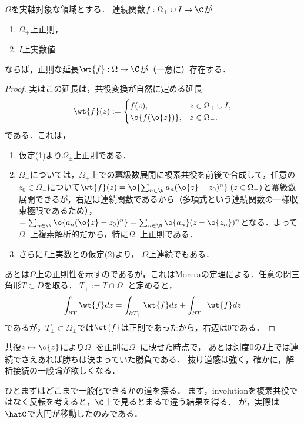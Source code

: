 \documentclass[uplatex, dvipdfmx]{jsreport}
\begin{document}
\begin{theorem}\label{thm-Schwarz-reflection-principle}
    $\Omega$を実軸対象な領域とする．
    連続関数$f:\Omega_+\cup I\to\C$が
    \begin{enumerate}
        \item $\Omega_+$上正則，
        \item $I$上実数値
    \end{enumerate}
    ならば，正則な延長$\wt{f}:\Omega\to\C$が（一意に）存在する．
\end{theorem}
\begin{proof}
    実はこの延長は，共役変換が自然に定める延長
    \[\wt{f}(z):=\begin{cases}
        f(z),&z\in\Omega_+\cup I,\\
        \o{f(\o{z})},&z\in\Omega_-.
    \end{cases}\]
    である．これは，
    \begin{enumerate}
        \item 仮定(1)より$\Omega_\pm$上正則である．
        \item $\Omega_-$については，$\Omega_+$上での冪級数展開に複素共役を前後で合成して，任意の$z_0\in\Omega_-$について$\wt{f}(z)=\o{\sum_{n\in\N}a_n(\o{z}-z_0)^n}\;(z\in\Omega_-)$と冪級数展開できるが，右辺は連続関数であるから（多項式という連続関数の一様収束極限であるため），
        $=\sum_{n\in\N}\o{a_n(\o{z}-z_0)^n}=\sum_{n\in\N}\o{a_n}(z-\o{z_n})^n$となる．よって$\Omega_-$上複素解析的だから，特に$\Omega_-$上正則である．
        \item さらに$I$上実数との仮定(2)より，
        $\Omega$上連続でもある．
    \end{enumerate}
    あとは$\Omega$上の正則性を示すのであるが，これはMoreraの定理による．任意の閉三角形$T\subset D$を取る．
    $T_\pm:=T\cap\Omega_\pm$と定めると，
    \[\int_{\partial T}\wt{f}dz=\int_{\partial T_+}\wt{f}dz+\int_{\partial T_-}\wt{f}dz\]
    であるが，$T^\circ_\pm\subset\Omega_\pm$では$\wt{f}$は正則であったから，右辺は$0$である．
\end{proof}
\begin{remarks}[葉での蝶の作り方]
    共役$z\mapsto\o{z}$により$\Omega_+$を正則に$\Omega_-$に映せた時点で，
    あとは測度$0$の$I$上では連続でさえあれば勝ちは決まっていた勝負である．
    抜け道感は強く，確かに，解析接続の一般論が欲しくなる．
\end{remarks}

ひとまずはどこまで一般化できるかの道を探る．
まず，involutionを複素共役ではなく反転を考えると，$\C$上で見るとまるで違う結果を得る．
が，実際は$\hatC$で大円が移動したのみである．
\end{document}
